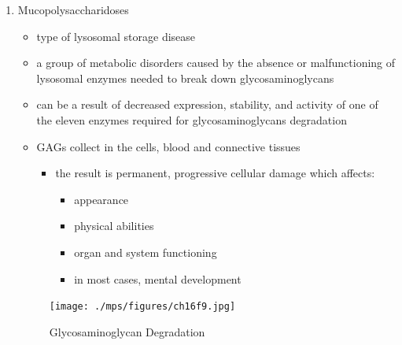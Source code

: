 \documentclass{scrartcl}
\begin{document}
\begin{enumerate}
\item Mucopolysaccharidoses
\label{sec:org78a528f}
\begin{itemize}
\item type of lysosomal storage disease
\item a group of metabolic disorders caused by the absence or
malfunctioning of lysosomal enzymes needed to break down
glycosaminoglycans
\item can be a result of decreased expression, stability, and activity of
one of the eleven enzymes required for glycosaminoglycans
degradation
\item GAGs collect in the cells, blood and connective tissues
\begin{itemize}
\item the result is permanent, progressive cellular damage which affects:
\begin{itemize}
\item appearance
\item physical abilities
\item organ and system functioning
\item in most cases, mental development
\end{itemize}
\end{itemize}
\end{itemize}

\begin{figure}[htbp]
\centering
\texttt{[image: ./mps/figures/ch16f9.jpg]}
\caption[Glycosaminoglycan Degradation]{\label{fig:org9999757}
Glycosaminoglycan Degradation}
\end{figure}


\end{enumerate}
\end{document}
